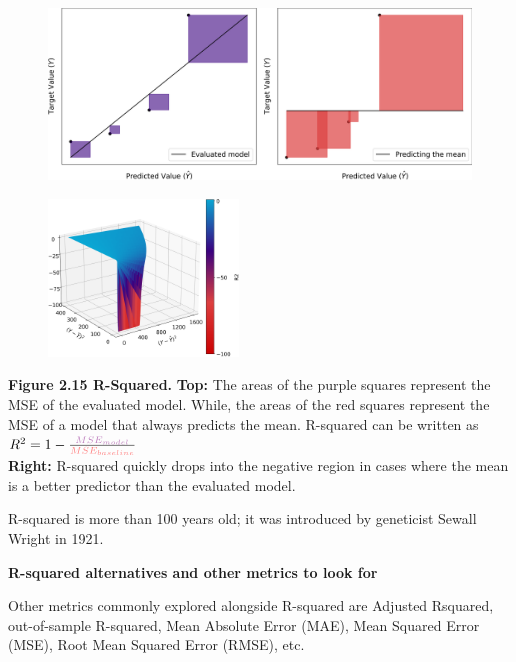 \clearpage
\thispagestyle{customstyle2}


\begin{figure}[ht!]
    \centering
    \includegraphics[width=\textwidth]{figures/R2_explained.png}
    \label{fig1}
\end{figure}

\begin{figure}
    \centering
    \vspace{-10pt} %
    \includegraphics[width=0.45\textwidth]{figures/R2_3d_surface.png} %
    \vspace{-10pt} %
\end{figure}

\textbf{Figure 2.15 R-Squared.} \textbf{Top:} The
areas of the purple squares
represent the MSE of the
evaluated model. While, the areas
of the red squares represent the
MSE of a model that always
predicts the mean. R-squared
can be written as $R^2 = 1-\frac{\color{violet!50}MSE_{model}}{\color{red!50}MSE_{baseline}}$\\
\textbf{Right:} R-squared quickly drops
into the negative region in cases
where the mean is a better
predictor than the evaluated
model.


{
R-squared is more than 100 years old; it was introduced by geneticist Sewall Wright in 1921.
}


\textbf{R-squared alternatives and other metrics to look for}

Other metrics commonly explored alongside R-squared are Adjusted Rsquared, out-of-sample R-squared, Mean Absolute Error (MAE), Mean Squared Error (MSE), Root Mean Squared Error (RMSE), etc.









